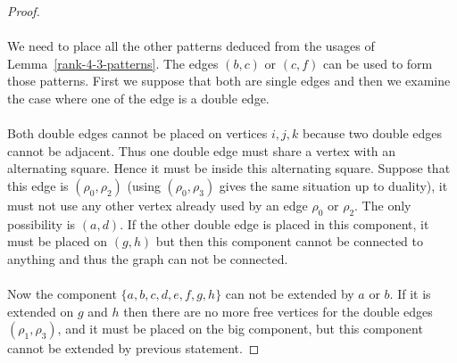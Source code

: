 \begin{proof}
\begin{figure}[H]
\begin{center}
      \caption{}
    \end{center}
  \end{figure}

  \paragraph{}
  We need to place all the other patterns deduced from the usages of Lemma~\ref{rank-4-3-patterns}. The edges $(b,c)$ or $(c,f)$ can be used to form those patterns. First we suppose that both are single edges and then we examine the case where one of the edge is a double edge.

  \paragraph{}
  Both double edges cannot be placed on vertices $i,j,k$ because two double edges cannot be adjacent. Thus one double edge must share a vertex with an alternating square. Hence it must be inside this alternating square. Suppose that this edge is $(\rho_0, \rho_2)$ (using $(\rho_0, \rho_3)$ gives the same situation up to duality), it must not use any other vertex already used by an edge $\rho_0$ or $\rho_2$. The only possibility is $(a,d)$. If the other double edge is placed in this component, it must be placed on $(g,h)$ but then this component cannot be connected to anything and thus the graph can not be connected.

  \paragraph{}
  Now the component $\{a,b,c,d,e,f,g,h\}$ can not be extended by $a$ or $b$. If it is extended on $g$ and $h$ then there are no more free vertices for the double edges $(\rho_1, \rho_3)$, and it must be placed on the big component, but this component cannot be extended by previous statement.


\end{proof}

